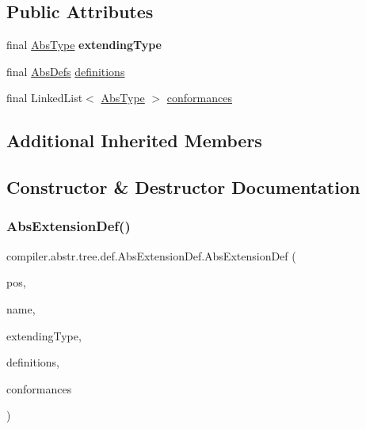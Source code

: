 \subsection*{Public Attributes}
\begin{DoxyCompactItemize}
\item 
\mbox{\label{classcompiler_1_1abstr_1_1tree_1_1def_1_1_abs_extension_def_a22f4c82b70a2d541c3d72f8807ddd336}} 
final \hyperlink{classcompiler_1_1abstr_1_1tree_1_1type_1_1_abs_type}{Abs\+Type} {\bfseries extending\+Type}
\item 
final \hyperlink{classcompiler_1_1abstr_1_1tree_1_1_abs_defs}{Abs\+Defs} \hyperlink{classcompiler_1_1abstr_1_1tree_1_1def_1_1_abs_extension_def_aedde8ef9d3532da24ca7e2121ffe255a}{definitions}
\item 
final Linked\+List$<$ \hyperlink{classcompiler_1_1abstr_1_1tree_1_1type_1_1_abs_type}{Abs\+Type} $>$ \hyperlink{classcompiler_1_1abstr_1_1tree_1_1def_1_1_abs_extension_def_a1d827271c43d2563392448f451e2828e}{conformances}
\end{DoxyCompactItemize}
\subsection*{Additional Inherited Members}


\subsection{Constructor \& Destructor Documentation}
\mbox{\label{classcompiler_1_1abstr_1_1tree_1_1def_1_1_abs_extension_def_a844a5e501fc6a7035aaed4280298360c}} 
\subsubsection{\texorpdfstring{Abs\+Extension\+Def()}{AbsExtensionDef()}}
{\footnotesize\ttfamily compiler.\+abstr.\+tree.\+def.\+Abs\+Extension\+Def.\+Abs\+Extension\+Def (\begin{DoxyParamCaption}\item[{\hyperlink{classcompiler_1_1_position}{Position}}]{pos,  }\item[{String}]{name,  }\item[{\hyperlink{classcompiler_1_1abstr_1_1tree_1_1type_1_1_abs_type}{Abs\+Type}}]{extending\+Type,  }\item[{\hyperlink{classcompiler_1_1abstr_1_1tree_1_1_abs_defs}{Abs\+Defs}}]{definitions,  }\item[{Linked\+List$<$ \hyperlink{classcompiler_1_1abstr_1_1tree_1_1type_1_1_abs_type}{Abs\+Type} $>$}]{conformances }\end{DoxyParamCaption})}


